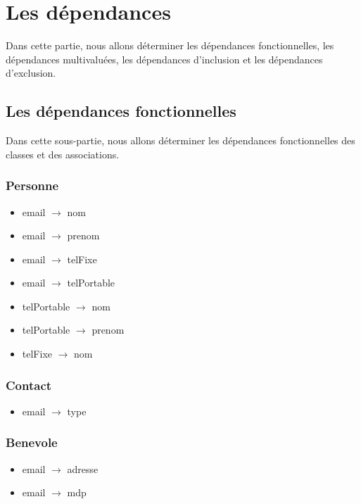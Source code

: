 \section{Les dépendances}

Dans cette partie, nous allons déterminer les dépendances fonctionnelles, les dépendances multivaluées,  les dépendances d'inclusion et les dépendances d'exclusion. \\

\subsection{Les dépendances fonctionnelles}

Dans cette sous-partie, nous allons déterminer les dépendances fonctionnelles des classes et des associations.  

\subsubsection*{Personne}
\begin{itemize}
\item[] email $\rightarrow$ nom 
\item[] email $\rightarrow$ prenom 
\item[] email $\rightarrow$ telFixe 
\item[] email $\rightarrow$ telPortable 
\item[] telPortable $\rightarrow$ nom
\item[] telPortable $\rightarrow$ prenom
\item[] telFixe $\rightarrow$ nom
\end{itemize}


\subsubsection*{Contact}
\begin{itemize}
\item[] email $\rightarrow$ type 
\end{itemize}

\subsubsection*{Benevole}
\begin{itemize}
\item[] email $\rightarrow$ adresse 
\item[] email $\rightarrow$ mdp 
\end{itemize}


